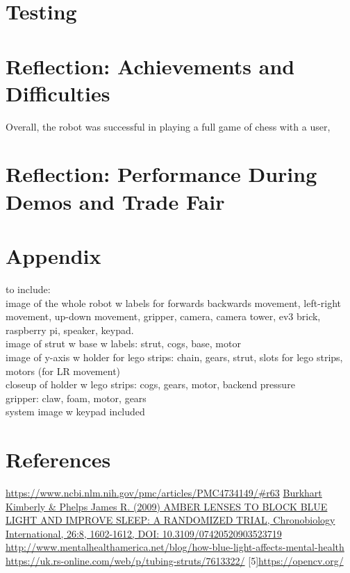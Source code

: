 \documentclass[onecolumn]{IEEEtran}
\begin{document}
\section{Testing}
\section{Reflection: Achievements and Difficulties}
Overall, the robot was successful in playing a full game of chess with a user, 
\section{Reflection: Performance During Demos and Trade Fair}
\section{Appendix}
to include:\\
image of the whole robot w labels for forwards backwards movement, left-right movement, up-down movement, gripper, camera, camera tower, ev3 brick, raspberry pi, speaker, keypad. \\
image of strut w base w labels: strut, cogs, base, motor\\
image of y-axis w holder for lego strips: chain, gears, strut, slots for lego strips, motors (for LR movement)\\
closeup of holder w lego strips: cogs, gears, motor, backend pressure\\
gripper: claw, foam, motor, gears\\
system image w keypad included \\

\section{References}
\noindent [1] \href{https://www.ncbi.nlm.nih.gov/pmc/articles/PMC4734149/\#r63}{https://www.ncbi.nlm.nih.gov/pmc/articles/PMC4734149/\#r63} \newline
[2] \href{https://www.tandfonline.com/doi/abs/10.3109/07420520903523719?casa_token=xuj5yeT4EWEAAAAA\%3ADS5C1NhfiI1XBogq05OfmNmXPNALfdGdCkl8oOSUKUsNgLJZQW5dzziJ_a5yXX3H1YCVc57m8jc\&}{Burkhart Kimberly \& Phelps James R. (2009) AMBER LENSES TO BLOCK BLUE LIGHT AND IMPROVE SLEEP: A RANDOMIZED TRIAL, Chronobiology International, 26:8, 1602-1612, DOI: 10.3109/07420520903523719} \newline
[3] \href{http://www.mentalhealthamerica.net/blog/how-blue-light-affects-mental-health}{http://www.mentalhealthamerica.net/blog/how-blue-light-affects-mental-health} \newline
[4]\href{https://uk.rs-online.com/web/p/tubing-struts/7613322/}{https://uk.rs-online.com/web/p/tubing-struts/7613322/}
[5]\href{https://opencv.org/}{https://opencv.org/}
\end{document}
